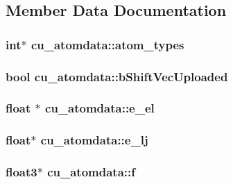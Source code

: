 \subsection{\-Member \-Data \-Documentation}
\hypertarget{structcu__atomdata_a933f973e308cf4847bfef5e9cef098dc}{
\subsubsection[{atom\-\_\-types}]{\setlength{\rightskip}{0pt plus 5cm}int$\ast$ {\bf cu\-\_\-atomdata\-::atom\-\_\-types}}}\label{structcu__atomdata_a933f973e308cf4847bfef5e9cef098dc}
\hypertarget{structcu__atomdata_a6aa24ad49612d99e52ae43676af1c3ba}{
\subsubsection[{b\-Shift\-Vec\-Uploaded}]{\setlength{\rightskip}{0pt plus 5cm}bool {\bf cu\-\_\-atomdata\-::b\-Shift\-Vec\-Uploaded}}}\label{structcu__atomdata_a6aa24ad49612d99e52ae43676af1c3ba}
\hypertarget{structcu__atomdata_a74e3b3a9d7f7425a08fd5afe1ee13a17}{
\subsubsection[{e\-\_\-el}]{\setlength{\rightskip}{0pt plus 5cm}float $\ast$ {\bf cu\-\_\-atomdata\-::e\-\_\-el}}}\label{structcu__atomdata_a74e3b3a9d7f7425a08fd5afe1ee13a17}
\hypertarget{structcu__atomdata_a2b398850ed9c1eb7893893e85684ae9b}{
\subsubsection[{e\-\_\-lj}]{\setlength{\rightskip}{0pt plus 5cm}float$\ast$ {\bf cu\-\_\-atomdata\-::e\-\_\-lj}}}\label{structcu__atomdata_a2b398850ed9c1eb7893893e85684ae9b}
\hypertarget{structcu__atomdata_af8dab044dea5a5c6cf2a43127e658484}{
\subsubsection[{f}]{\setlength{\rightskip}{0pt plus 5cm}float3$\ast$ {\bf cu\-\_\-atomdata\-::f}}}\label{structcu__atomdata_af8dab044dea5a5c6cf2a43127e658484}
